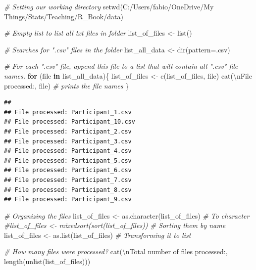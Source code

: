 \documentclass[
]{book}
\newenvironment{Shaded}{\begin{snugshade}}{\end{snugshade}}
\newcommand{\AttributeTok}[1]{\textcolor[rgb]{0.77,0.63,0.00}{#1}}
\newcommand{\CommentTok}[1]{\textcolor[rgb]{0.56,0.35,0.01}{\textit{#1}}}
\newcommand{\ControlFlowTok}[1]{\textcolor[rgb]{0.13,0.29,0.53}{\textbf{#1}}}
\newcommand{\FunctionTok}[1]{\textcolor[rgb]{0.00,0.00,0.00}{#1}}
\newcommand{\NormalTok}[1]{#1}
\newcommand{\OtherTok}[1]{\textcolor[rgb]{0.56,0.35,0.01}{#1}}
\newcommand{\SpecialCharTok}[1]{\textcolor[rgb]{0.00,0.00,0.00}{#1}}
\newcommand{\StringTok}[1]{\textcolor[rgb]{0.31,0.60,0.02}{#1}}
\begin{document}
\begin{Shaded}
\begin{Highlighting}[]
\CommentTok{\# Setting our working directory}
\FunctionTok{setwd}\NormalTok{(}\StringTok{\textquotesingle{}C:/Users/fabio/OneDrive/My Things/Stats/Teaching/R\_Book/data\textquotesingle{}}\NormalTok{)}

\CommentTok{\# Empty list to list all txt files in folder}
\NormalTok{list\_of\_files }\OtherTok{\textless{}{-}} \FunctionTok{list}\NormalTok{()}

\CommentTok{\# Searches for ".csv" files in the folder}
\NormalTok{list\_all\_data }\OtherTok{\textless{}{-}} \FunctionTok{dir}\NormalTok{(}\AttributeTok{pattern=}\StringTok{\textquotesingle{}.csv\textquotesingle{}}\NormalTok{)}

\CommentTok{\# For each ".csv" file, append this file to a list that will contain all ".csv" file names.}
\ControlFlowTok{for}\NormalTok{ (file }\ControlFlowTok{in}\NormalTok{ list\_all\_data)\{}
\NormalTok{  list\_of\_files }\OtherTok{\textless{}{-}} \FunctionTok{c}\NormalTok{(list\_of\_files, file)}
  \FunctionTok{cat}\NormalTok{(}\StringTok{\textquotesingle{}}\SpecialCharTok{\textbackslash{}n}\StringTok{File processed:\textquotesingle{}}\NormalTok{, file)  }\CommentTok{\# prints the file names}
\NormalTok{\}}
\end{Highlighting}
\end{Shaded}

\begin{verbatim}
## 
## File processed: Participant_1.csv
## File processed: Participant_10.csv
## File processed: Participant_2.csv
## File processed: Participant_3.csv
## File processed: Participant_4.csv
## File processed: Participant_5.csv
## File processed: Participant_6.csv
## File processed: Participant_7.csv
## File processed: Participant_8.csv
## File processed: Participant_9.csv
\end{verbatim}

\begin{Shaded}
\begin{Highlighting}[]
\CommentTok{\# Organizing the files}
\NormalTok{list\_of\_files }\OtherTok{\textless{}{-}} \FunctionTok{as.character}\NormalTok{(list\_of\_files)  }\CommentTok{\# To character}
\CommentTok{\#list\_of\_files \textless{}{-} mixedsort(sort(list\_of\_files))  \# Sorting them by name}
\NormalTok{list\_of\_files }\OtherTok{\textless{}{-}} \FunctionTok{as.list}\NormalTok{(list\_of\_files)  }\CommentTok{\# Transforming it to list}

\CommentTok{\# How many files were processed?}
\FunctionTok{cat}\NormalTok{(}\StringTok{\textquotesingle{}}\SpecialCharTok{\textbackslash{}n}\StringTok{Total number of files processed:\textquotesingle{}}\NormalTok{, }\FunctionTok{length}\NormalTok{(}\FunctionTok{unlist}\NormalTok{(list\_of\_files)))}
\end{Highlighting}
\end{Shaded}
\end{document}
